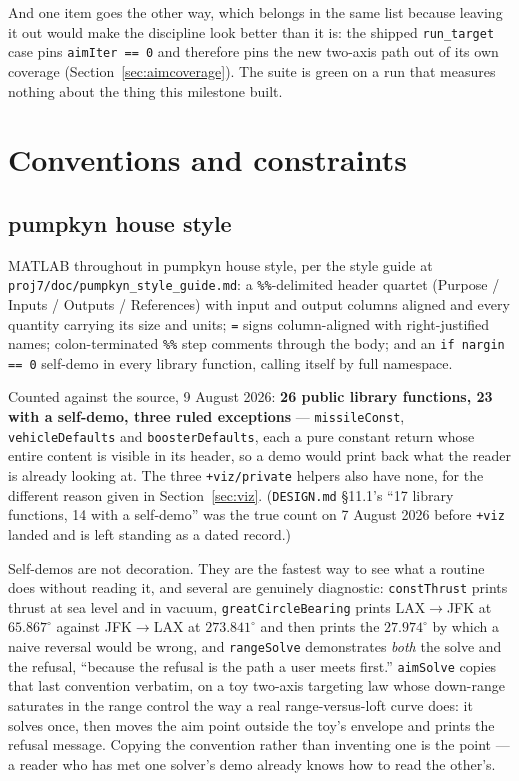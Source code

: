 \documentclass[11pt]{article}
\newcommand{\code}[1]{\texttt{#1}}
\newcommand{\pkg}[1]{\texttt{+#1}}
\begin{document}
And one item goes the other way, which belongs in the same list because
leaving it out would make the discipline look better than it is: the shipped
\code{run\_target} case pins \code{aimIter == 0} and therefore pins the new
two-axis path out of its own coverage (Section~\ref{sec:aimcoverage}). The
suite is green on a run that measures nothing about the thing this milestone
built.

\section{Conventions and constraints}
\label{sec:conv}

\subsection{pumpkyn house style}

MATLAB throughout in pumpkyn house style, per the style guide at
\code{proj7/doc/pumpkyn\_style\_guide.md}: a
\code{\%\%}-delimited header quartet (Purpose / Inputs / Outputs /
References) with input and output columns aligned and every quantity carrying
its size and units; \code{=} signs column-aligned with right-justified names;
colon-terminated \code{\%\%} step comments through the body; and an
\code{if nargin == 0} self-demo in every library function, calling itself by
full namespace.

Counted against the source, 9 August 2026: \textbf{26 public library functions,
23 with a self-demo, three ruled exceptions} --- \code{missileConst},
\code{vehicleDefaults} and \code{boosterDefaults}, each a pure constant return
whose entire content is visible in its header, so a demo would print back what
the reader is already looking at. The three \code{+viz/private} helpers also
have none, for the different reason given in Section~\ref{sec:viz}.
(\code{DESIGN.md} \S11.1's ``17 library functions, 14 with a self-demo'' was
the true count on 7 August 2026 before \pkg{viz} landed and is left standing as
a dated record.)

Self-demos are not decoration. They are the fastest way to see what a routine
does without reading it, and several are genuinely diagnostic:
\code{constThrust} prints thrust at sea level and in vacuum,
\code{greatCircleBearing} prints LAX$\to$JFK at $65.867^\circ$ against
JFK$\to$LAX at $273.841^\circ$ and then prints the $27.974^\circ$ by which a
naive reversal would be wrong, and \code{rangeSolve} demonstrates \emph{both}
the solve and the refusal, ``because the refusal is the path a user meets
first.'' \code{aimSolve} copies that last convention verbatim, on a toy
two-axis targeting law whose down-range saturates in the range control the way
a real range-versus-loft curve does: it solves once, then moves the aim point
outside the toy's envelope and prints the refusal message. Copying the
convention rather than inventing one is the point --- a reader who has met one
solver's demo already knows how to read the other's.
\end{document}
